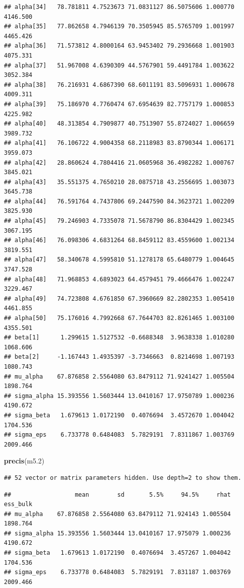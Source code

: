 \documentclass[
]{book}
\newenvironment{Shaded}{\begin{snugshade}}{\end{snugshade}}
\newcommand{\FloatTok}[1]{\textcolor[rgb]{0.00,0.00,0.81}{#1}}
\newcommand{\FunctionTok}[1]{\textcolor[rgb]{0.13,0.29,0.53}{\textbf{#1}}}
\newcommand{\NormalTok}[1]{#1}
\begin{document}
\begin{verbatim}
## alpha[34]   78.781811 4.7523673 71.0831127 86.5075606 1.000770 4146.500
## alpha[35]   77.862658 4.7946139 70.3505945 85.5765709 1.001997 4465.426
## alpha[36]   71.573812 4.8000164 63.9453402 79.2936668 1.001903 4075.331
## alpha[37]   51.967008 4.6390309 44.5767901 59.4491784 1.003622 3052.384
## alpha[38]   76.216931 4.6867390 68.6011191 83.5096931 1.000678 4009.311
## alpha[39]   75.186970 4.7760474 67.6954639 82.7757179 1.000853 4225.982
## alpha[40]   48.313854 4.7909877 40.7513907 55.8724027 1.006659 3989.732
## alpha[41]   76.106722 4.9004358 68.2118983 83.8790344 1.006171 3959.073
## alpha[42]   28.860624 4.7804416 21.0605968 36.4982282 1.000767 3845.021
## alpha[43]   35.551375 4.7650210 28.0875718 43.2556695 1.003073 3645.738
## alpha[44]   76.591764 4.7437806 69.2447590 84.3623721 1.002209 3825.930
## alpha[45]   79.246903 4.7335078 71.5678790 86.8304429 1.002345 3067.195
## alpha[46]   76.098306 4.6831264 68.8459112 83.4559600 1.002134 3819.551
## alpha[47]   58.340678 4.5995810 51.1278178 65.6480779 1.004645 3747.528
## alpha[48]   71.968853 4.6893023 64.4579451 79.4666476 1.002247 3229.467
## alpha[49]   74.723808 4.6761850 67.3960669 82.2802353 1.005410 4461.855
## alpha[50]   75.176016 4.7992668 67.7644703 82.8261465 1.003100 4355.501
## beta[1]      1.299615 1.5127532 -0.6688348  3.9638338 1.010280 1068.606
## beta[2]     -1.167443 1.4935397 -3.7346663  0.8214698 1.007193 1080.743
## mu_alpha    67.876858 2.5564080 63.8479112 71.9241427 1.005504 1898.764
## sigma_alpha 15.393556 1.5603444 13.0410167 17.9750789 1.000236 4190.672
## sigma_beta   1.679613 1.0172190  0.4076694  3.4572670 1.004042 1704.536
## sigma_eps    6.733778 0.6484083  5.7829191  7.8311867 1.003769 2009.466
\end{verbatim}

\begin{Shaded}
\begin{Highlighting}[]
\FunctionTok{precis}\NormalTok{(m5}\FloatTok{.2}\NormalTok{)}
\end{Highlighting}
\end{Shaded}

\begin{verbatim}
## 52 vector or matrix parameters hidden. Use depth=2 to show them.
\end{verbatim}

\begin{verbatim}
##                  mean        sd       5.5%     94.5%     rhat ess_bulk
## mu_alpha    67.876858 2.5564080 63.8479112 71.924143 1.005504 1898.764
## sigma_alpha 15.393556 1.5603444 13.0410167 17.975079 1.000236 4190.672
## sigma_beta   1.679613 1.0172190  0.4076694  3.457267 1.004042 1704.536
## sigma_eps    6.733778 0.6484083  5.7829191  7.831187 1.003769 2009.466
\end{verbatim}
\end{document}
